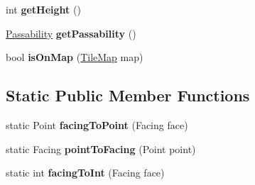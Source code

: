 \begin{DoxyCompactItemize}
\item 
\hypertarget{class_simple_r_p_g_1_1_map_object_a71210665b57a6ea94e1ad8232d067828}{int {\bfseries get\-Height} ()}\label{class_simple_r_p_g_1_1_map_object_a71210665b57a6ea94e1ad8232d067828}

\item 
\hypertarget{class_simple_r_p_g_1_1_map_object_a0c72f383828177a237a1347ce151a5ae}{\hyperlink{namespace_simple_r_p_g_a5f1ec21e7f4e36278a6cedd38c51e650}{Passability} {\bfseries get\-Passability} ()}\label{class_simple_r_p_g_1_1_map_object_a0c72f383828177a237a1347ce151a5ae}

\item 
\hypertarget{class_simple_r_p_g_1_1_map_object_a318f3ee4c39a9a5cc6fb5933c9c3778e}{bool {\bfseries is\-On\-Map} (\hyperlink{class_simple_r_p_g_1_1_tile_map}{Tile\-Map} map)}\label{class_simple_r_p_g_1_1_map_object_a318f3ee4c39a9a5cc6fb5933c9c3778e}

\end{DoxyCompactItemize}
\subsection*{Static Public Member Functions}
\begin{DoxyCompactItemize}
\item 
\hypertarget{class_simple_r_p_g_1_1_map_object_a52ee46b1a27838426c06d1324bcfde4e}{static Point {\bfseries facing\-To\-Point} (Facing face)}\label{class_simple_r_p_g_1_1_map_object_a52ee46b1a27838426c06d1324bcfde4e}

\item 
\hypertarget{class_simple_r_p_g_1_1_map_object_a4acb120e4b9fe431e0ad6f0ecb4ffb91}{static Facing {\bfseries point\-To\-Facing} (Point point)}\label{class_simple_r_p_g_1_1_map_object_a4acb120e4b9fe431e0ad6f0ecb4ffb91}

\item 
\hypertarget{class_simple_r_p_g_1_1_map_object_a213905eca91fb7aa102754c09bbb5d4b}{static int {\bfseries facing\-To\-Int} (Facing face)}\label{class_simple_r_p_g_1_1_map_object_a213905eca91fb7aa102754c09bbb5d4b}

\end{DoxyCompactItemize}
